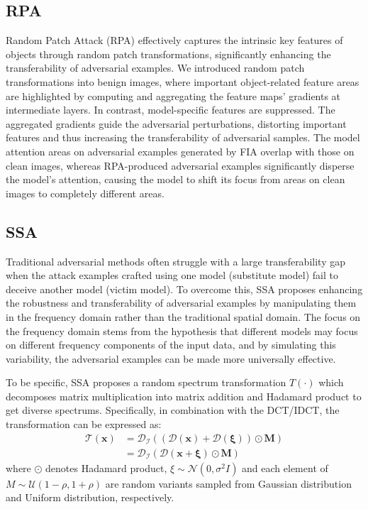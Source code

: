 \subsection{RPA}
Random Patch Attack (RPA) effectively captures the intrinsic key features of objects through random patch transformations, significantly enhancing the transferability of adversarial examples. We introduced random patch transformations into benign images, where important object-related feature areas are highlighted by computing and aggregating the feature maps' gradients at intermediate layers. In contrast, model-specific features are suppressed. The aggregated gradients guide the adversarial perturbations, distorting important features and thus increasing the transferability of adversarial samples. The model attention areas on adversarial examples generated by FIA overlap with those on clean images, whereas RPA-produced adversarial examples significantly disperse the model's attention, causing the model to shift its focus from areas on clean images to completely different areas.


\subsection{SSA}
Traditional adversarial methods often struggle with a large transferability gap when the attack examples crafted using one model (substitute model) fail to deceive another model (victim model). To overcome this, SSA proposes enhancing the robustness and transferability of adversarial examples by manipulating them in the frequency domain rather than the traditional spatial domain. The focus on the frequency domain stems from the hypothesis that different models may focus on different frequency components of the input data, and by simulating this variability, the adversarial examples can be made more universally effective.

To be specific, SSA proposes a random spectrum transformation $T(\cdot)$ which decomposes matrix multiplication into matrix addition and Hadamard product to get diverse spectrums. Specifically, in combination with the DCT/IDCT, the transformation can be expressed as:
\begin{align}
    \mathcal{T}(\bm{x}) &= \mathcal{D_I}((\mathcal{D}(\bm{x}) + \mathcal{D}(\bm{\xi})) \odot \bm{M}) \\
                        &= \mathcal{D_I}(\mathcal{D}(\bm{x} + \bm{\xi}) \odot \bm{M})
\end{align}
where $\odot$ denotes Hadamard product, $\xi \sim \mathcal{N}(0, \sigma^2 I)$ and each element of $M \sim \mathcal{U}(1-\rho, 1+\rho)$ are random variants sampled from Gaussian distribution and Uniform distribution, respectively. 

